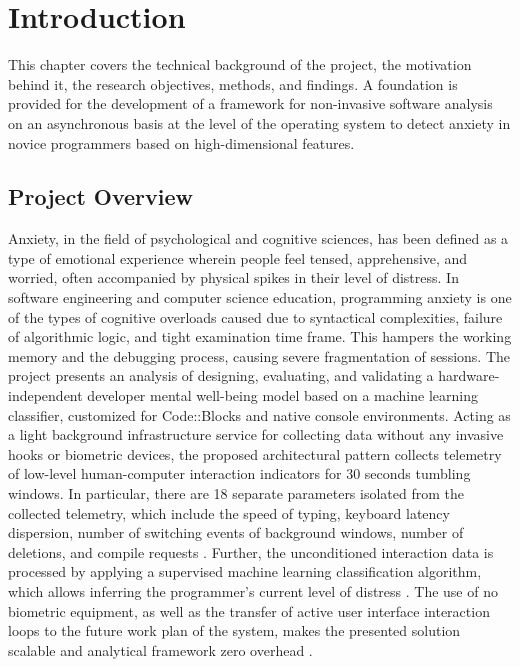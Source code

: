 \chapter{Introduction}

This chapter covers the technical background of the project, the motivation behind it, the research objectives, methods, and findings. A foundation is provided for the development of a framework for non-invasive software analysis on an asynchronous basis at the level of the operating system to detect anxiety in novice programmers based on high-dimensional features.

\section{Project Overview}
Anxiety, in the field of psychological and cognitive sciences, has been defined as a type of emotional experience wherein people feel tensed, apprehensive, and worried, often accompanied by physical spikes in their level of distress. In software engineering and computer science education, programming anxiety is one of the types of cognitive overloads caused due to syntactical complexities, failure of algorithmic logic, and tight examination time frame. This hampers the working memory and the debugging process, causing severe fragmentation of sessions.
The project presents an analysis of designing, evaluating, and validating a hardware-independent developer mental well-being model based on a machine learning classifier, customized for Code::Blocks and native console environments. Acting as a light background infrastructure service for collecting data without any invasive hooks or biometric devices, the proposed architectural pattern collects telemetry of low-level human-computer interaction indicators for 30 seconds tumbling windows. In particular, there are 18 separate parameters isolated from the collected telemetry, which include the speed of typing, keyboard latency dispersion, number of switching events of background windows, number of deletions, and compile requests \cite{zhang2023keystroke, epp2015emotion}. Further, the unconditioned interaction data is processed by applying a supervised machine learning classification algorithm, which allows inferring the programmer's current level of distress \cite{acm345697, anxietyPrediction2023}. The use of no biometric equipment, as well as the transfer of active user interface interaction loops to the future work plan of the system, makes the presented solution scalable and analytical framework zero overhead \cite{selfreg2023, arean2025jitai}.

